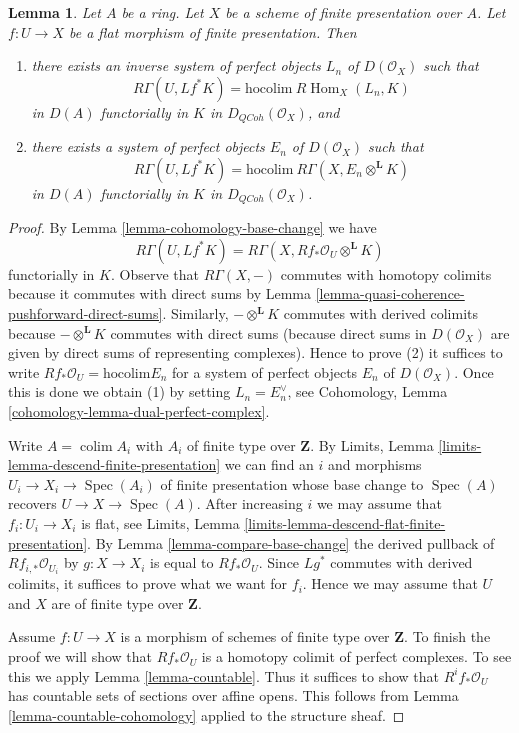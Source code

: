 \documentclass{stacks-project}
\theoremstyle{plain}
\newtheorem{lemma}[subsection]{Lemma}
\theoremstyle{definition}
\theoremstyle{remark}
\numberwithin{equation}{subsection}
\def\colim{\mathop{\mathrm{colim}}\nolimits}
\def\Spec{\mathop{\mathrm{Spec}}}
\def\Hom{\mathop{\mathrm{Hom}}\nolimits}
\def\QCoh{\mathit{QCoh}}
\begin{document}
\begin{lemma}
\label{lemma-computing-sections-as-colim}
Let $A$ be a ring. Let $X$ be a scheme of finite presentation over $A$.
Let $f : U \to X$ be a flat morphism of finite presentation. Then
\begin{enumerate}
\item there exists an inverse system of perfect objects $L_n$ of
$D(\mathcal{O}_X)$ such that
$$
R\Gamma(U, Lf^*K) = \text{hocolim}\ R\Hom_X(L_n, K)
$$
in $D(A)$ functorially in $K$ in $D_\QCoh(\mathcal{O}_X)$, and
\item there exists a system of perfect objects $E_n$ of
$D(\mathcal{O}_X)$ such that
$$
R\Gamma(U, Lf^*K) = \text{hocolim}\ R\Gamma(X, E_n \otimes^\mathbf{L} K)
$$
in $D(A)$ functorially in $K$ in $D_\QCoh(\mathcal{O}_X)$.
\end{enumerate}
\end{lemma}

\begin{proof}
By Lemma \ref{lemma-cohomology-base-change} we have
$$
R\Gamma(U, Lf^*K) = R\Gamma(X, Rf_*\mathcal{O}_U \otimes^\mathbf{L} K)
$$
functorially in $K$. Observe that $R\Gamma(X, -)$ commutes with
homotopy colimits because it commutes with direct sums by
Lemma \ref{lemma-quasi-coherence-pushforward-direct-sums}.
Similarly, $- \otimes^\mathbf{L} K$ commutes with derived colimits
because $- \otimes^\mathbf{L} K$ commutes with direct sums
(because direct sums in $D(\mathcal{O}_X)$
are given by direct sums of representing complexes).
Hence to prove (2) it suffices to write
$Rf_*\mathcal{O}_U = \text{hocolim} E_n$ for a system of
perfect objects $E_n$ of $D(\mathcal{O}_X)$. Once this is done
we obtain (1) by setting $L_n = E_n^\vee$, see
Cohomology, Lemma \ref{cohomology-lemma-dual-perfect-complex}.

\medskip\noindent
Write $A = \colim A_i$ with $A_i$ of finite type over $\mathbf{Z}$.
By Limits, Lemma \ref{limits-lemma-descend-finite-presentation}
we can find an $i$ and morphisms $U_i \to X_i \to \Spec(A_i)$
of finite presentation whose base change to $\Spec(A)$ recovers
$U \to X \to \Spec(A)$.
After increasing $i$ we may assume that $f_i : U_i \to X_i$ is
flat, see Limits, Lemma \ref{limits-lemma-descend-flat-finite-presentation}.
By Lemma \ref{lemma-compare-base-change}
the derived pullback of $Rf_{i, *}\mathcal{O}_{U_i}$
by $g : X \to X_i$ is equal to $Rf_*\mathcal{O}_U$.
Since $Lg^*$ commutes with derived colimits, it suffices
to prove what we want for $f_i$. Hence we may assume that
$U$ and $X$ are of finite type over $\mathbf{Z}$.

\medskip\noindent
Assume $f : U \to X$ is a morphism of schemes of finite type over $\mathbf{Z}$.
To finish the proof we will show that $Rf_*\mathcal{O}_U$ is a homotopy
colimit of perfect complexes. To see this we apply Lemma \ref{lemma-countable}.
Thus it suffices to show that $R^if_*\mathcal{O}_U$
has countable sets of sections over affine opens.
This follows from Lemma \ref{lemma-countable-cohomology}
applied to the structure sheaf.
\end{proof}
\end{document}
